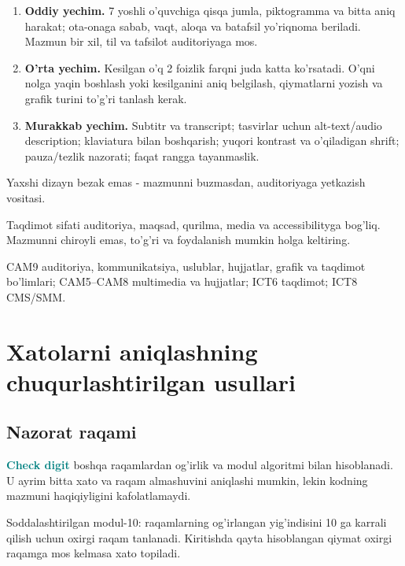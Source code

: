\documentclass[11pt,a4paper,oneside]{book}
\newcommand{\term}[1]{\textbf{\textcolor{Teal}{#1}}\index{#1}}
\begin{document}
\begin{solutionbox}
\begin{enumerate}[leftmargin=7mm]
\item \textbf{Oddiy yechim.} 7 yoshli o'quvchiga qisqa jumla, piktogramma va bitta aniq harakat; ota-onaga sabab, vaqt, aloqa va batafsil yo'riqnoma beriladi. Mazmun bir xil, til va tafsilot auditoriyaga mos.
\item \textbf{O'rta yechim.} Kesilgan o'q 2 foizlik farqni juda katta ko'rsatadi. O'qni nolga yaqin boshlash yoki kesilganini aniq belgilash, qiymatlarni yozish va grafik turini to'g'ri tanlash kerak.
\item \textbf{Murakkab yechim.} Subtitr va transcript; tasvirlar uchun alt-text/audio description; klaviatura bilan boshqarish; yuqori kontrast va o'qiladigan shrift; pauza/tezlik nazorati; faqat rangga tayanmaslik.
\end{enumerate}
\end{solutionbox}
\begin{attest}Yaxshi dizayn bezak emas - mazmunni buzmasdan, auditoriyaga yetkazish vositasi.\end{attest}

\begin{summarybox}
Taqdimot sifati auditoriya, maqsad, qurilma, media va accessibilityga bog'liq. Mazmunni chiroyli emas, to'g'ri va foydalanish mumkin holga keltiring.
\end{summarybox}
\begin{sourcebox}
CAM9 auditoriya, kommunikatsiya, uslublar, hujjatlar, grafik va taqdimot bo'limlari; CAM5--CAM8 multimedia va hujjatlar; ICT6 taqdimot; ICT8 CMS/SMM.
\end{sourcebox}

\section{Xatolarni aniqlashning chuqurlashtirilgan usullari}
\subsection{Nazorat raqami}
\term{Check digit} boshqa raqamlardan og'irlik va modul algoritmi bilan hisoblanadi. U ayrim bitta xato va raqam almashuvini aniqlashi mumkin, lekin kodning mazmuni haqiqiyligini kafolatlamaydi.

\begin{examplebox}
Soddalashtirilgan modul-10: raqamlarning og'irlangan yig'indisini 10 ga karrali qilish uchun oxirgi raqam tanlanadi. Kiritishda qayta hisoblangan qiymat oxirgi raqamga mos kelmasa xato topiladi.
\end{examplebox}
\end{document}

